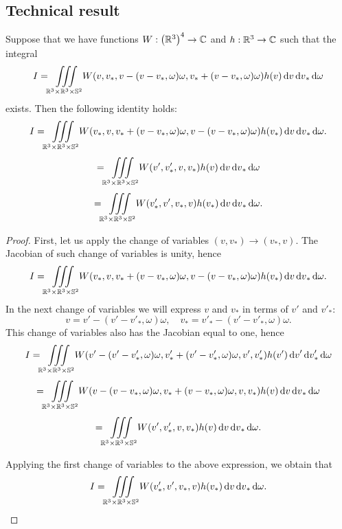 \begin{subappendices}
  \section{Technical result} %
  \label{sec:technical_propositions}
  \begin{proposition} 
	Suppose that we have functions  $W:\left(\mrt\right)^4\to\mathbb C$ and $h:\mrt\to \mathbb C$ such that the integral
	\[I=\coll W(v,v_\ast,v-(v-v_\ast,\omega)\omega,v_\ast+(v-v_\ast,\omega)\omega)h(v)\dv\dv_\ast\dom\] exists.
	Then the following identity holds:
	\[I= 
	\coll W(v_\ast,v,v_\ast+(v-v_\ast,\omega)\omega,v-(v-v_\ast,\omega)\omega)h(v_\ast)\dv\dv_\ast\dom.\]
	\[=\coll W(v',v'_\ast,v,v_\ast)h(v)\dv\dv_\ast\dom\]
	\[=\coll W(v'_\ast,v' ,v_\ast,v)h(v_\ast)\dv\dv_\ast\dom.\]
\end{proposition}
\begin{proof}
	First, let us apply the change of variables $(v,v_\ast)\to (v_\ast,v)$. The Jacobian of such change of variables is unity, hence 
	\[I= \coll W(v_\ast,v,v_\ast+(v-v_\ast,\omega)\omega,v-(v-v_\ast,\omega)\omega)h(v_\ast)\dv\dv_\ast\dom.\]
	In the next change of variables we will express $v$ and $v_\ast$  in terms of $v '$ and $v'_\ast$:
	\[v= v'-(v'-v'_\ast,\omega)\omega,\quad v_\ast= v'_\ast-(v'-v'_\ast,\omega)\omega.\]
	This change of variables also has the Jacobian equal to one, hence 
	\[I=\coll W(v'-(v'-v'_\ast,\omega)\omega,v'_\ast+(v'-v'_\ast,\omega)\omega,v',v'_\ast)h(v')\dv'\dv'_\ast\dom\]
	\[=\coll W(v-(v-v_\ast,\omega)\omega,v_\ast+(v-v_\ast,\omega)\omega,v,v_\ast)h(v)\dv\dv_\ast\dom\]
	\[=\coll W(v',v'_\ast,v,v_\ast)h(v)\dv\dv_\ast\dom.\]

	Applying the first change of variables to the above expression, we obtain that
	\[I=\coll W(v'_\ast,v' ,v_\ast,v)h(v_\ast)\dv\dv_\ast\dom.\]
\end{proof}

 
\end{subappendices}%
%
% 
%
%
